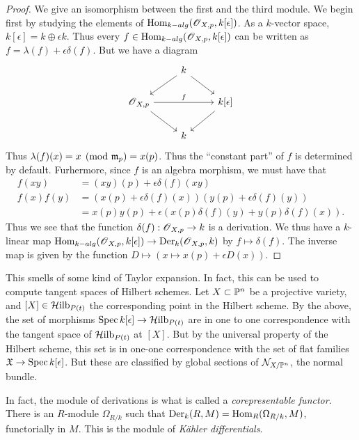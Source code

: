 \documentclass[11pt, english]{article}
\begin{document}
\begin{proof}
We give an isomorphism between the first and the third module. We begin first by studying the elements of $\operatorname{Hom}_{k-alg}(\operatorname{\mathscr{O}}_{X,p},k[\epsilon])$. As a $k$-vector space, $k[\epsilon] = k \oplus \epsilon k$. Thus every $f \in \operatorname{Hom}_{k-alg}(\operatorname{\mathscr{O}}_{X,p},k[\epsilon])$ can be written as $f = \lambda(f) + \epsilon \delta(f)$. But we have a diagram
\[
\begin{tikzcd}
{}& k \arrow{dr} \arrow{dl} & \\
\OO_{X,p} \arrow{dr} \arrow{rr}{f} & & k[\epsilon] \arrow{dl} \\
 & k  
\end{tikzcd}
\]
Thus $\lambda(f)(x) = x \pmod {\mathfrak{m}_p}  = x(p)$. Thus the ``constant part'' of $f$ is determined by default. Furhermore, since $f$ is an algebra morphism, we must have that
\begin{align*}
  f(xy) &= (xy)(p) + \epsilon \delta(f)(xy) \\
f(x)f(y) &= (x(p)+\epsilon \delta(f)(x))(y(p)+\epsilon \delta(f)(y)) \\
&= x(p)y(p) + \epsilon \left( x(p) \delta(f)(y) + y(p) \delta(f)(x)\right).
\end{align*}
Thus we see that the function $\delta(f):\operatorname{\mathscr{O}}_{X,p} \to k$ is a derivation. We thus have a $k$-linear map $\operatorname{Hom}_{k-alg}(\operatorname{\mathscr{O}}_{X,p},k[\epsilon]) \to \operatorname{Der}_k(\operatorname{\mathscr{O}}_{X,p},k)$ by $f \mapsto \delta(f)$. The inverse map is given by the function $D \mapsto {(x \mapsto x(p) + \epsilon D(x))}$. 
\end{proof}

\begin{remark}
This smells of some kind of Taylor expansion. In fact, this can be used to compute tangent spaces of Hilbert schemes. Let $X \subset \mathbb{P}^n$ be a projective variety, and $[X] \in \mathcal{H}\mathrm{ilb}_{P(t)}$ the corresponding point in the Hilbert scheme. By the above, the set of morphisms $\operatorname{Spec} k[\epsilon] \to \mathcal{H}\mathrm{ilb}_{P(t)}$ are in one to one correspondence with the tangent space of $\mathcal{H}\mathrm{ilb}_{P(t)}$ at $[X]$. But by the universal property of the Hilbert scheme, this set is in one-one correspondence with the set of flat families $\mathfrak X \to \operatorname{Spec} k[\epsilon]$. But these are classified by global sections of $\mathcal N_{X/\mathbb{P}^n}$, the normal bundle.
\end{remark}

In fact, the module of derivations is what is called a \emph{corepresentable functor}. There is an $R$-module $\Omega_{R/k}$ such that $\operatorname{Der}_k(R,M)=\operatorname{Hom}_R(\Omega_{R/k},M)$, functorially in $M$. This is the module of \emph{Kähler differentials}.
\end{document}
